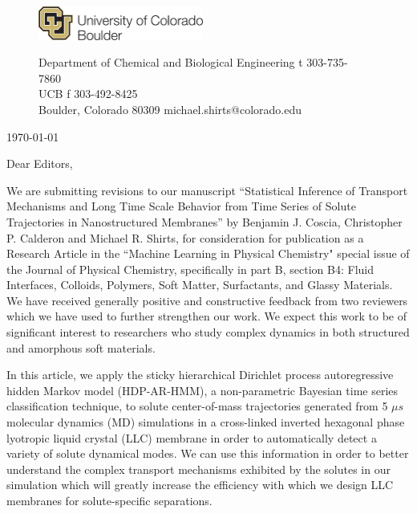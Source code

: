\documentclass[fontsize=11pt]{article}
\begin{document}
	\graphicspath{{./figures/}}

	\begin{figure}
	\centering
	\begin{minipage}{0.37\textwidth}
	\includegraphics[width=2.14in,left]{CUBoulder.pdf}
	\end{minipage}
	\begin{minipage}{0.62\textwidth}
	\scriptsize
	\noindent Department of Chemical and Biological Engineering \hfill t 303-735-7860~~~~~~~~~~~~~~~~~~ \\
	 UCB \hfill f 303-492-8425~~~~~~~~~~~~~~~~~~ \\
	\noindent Boulder, Colorado 80309 \hfill michael.shirts@colorado.edu \\
	\end{minipage}
	\end{figure}
	
	\noindent \today

	\noindent Dear Editors,\\
	
	\newcommand{\ManuscriptTitle}{Statistical Inference of Transport Mechanisms and
	Long Time Scale Behavior from Time Series of Solute Trajectories in 
	Nanostructured Membranes}
	
	We are submitting revisions to our manuscript ``\ManuscriptTitle'' by Benjamin 
	J. Coscia, Christopher P. Calderon and Michael R. Shirts, for consideration for 
	publication as a Research Article in the ``Machine Learning in Physical Chemistry"
	special issue of the Journal of Physical Chemistry, specifically in part B, section
	B4: Fluid Interfaces, Colloids, Polymers, Soft Matter, Surfactants, and Glassy Materials.
	We have received generally positive and constructive feedback from two reviewers
	which we have used to further strengthen our work. We expect this work to be of 
	significant interest to researchers who study complex dynamics in both structured
	and amorphous soft materials.
	

	In this article, we apply the sticky hierarchical Dirichlet process autoregressive
	hidden Markov model (HDP-AR-HMM), a non-parametric Bayesian time series
	classification technique, to solute center-of-mass trajectories generated from
	5 $\mu s$ molecular dynamics (MD) simulations in a cross-linked inverted hexagonal
	phase lyotropic liquid crystal (LLC) membrane in order to automatically detect a
	variety of solute dynamical modes. We can use this information in order to 
	better understand the complex transport mechanisms exhibited by the solutes in 
	our simulation which will greatly increase the efficiency with which we 
	design LLC membranes for solute-specific separations.
	
\end{document}
